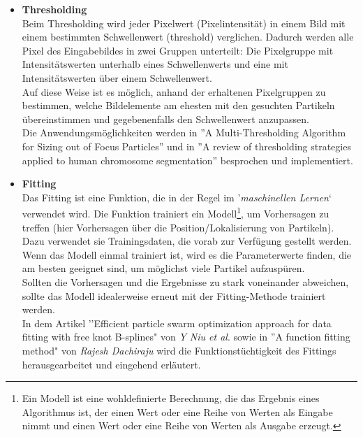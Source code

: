 \begin{itemize}
\item \textbf{Thresholding}\\
Beim Thresholding wird jeder Pixelwert (Pixelintensität) in einem Bild mit einem bestimmten Schwellenwert (threshold) verglichen. Dadurch werden alle Pixel des Eingabebildes in zwei Gruppen unterteilt: Die Pixelgruppe mit Intensitätswerten unterhalb eines Schwellenwerts und eine mit Intensitätswerten über einem Schwellenwert.\\
Auf diese Weise ist es möglich, anhand der erhaltenen Pixelgruppen zu bestimmen, welche Bildelemente am ehesten mit den gesuchten Partikeln übereinstimmen und gegebenenfalls den Schwellenwert anzupassen.\\
Die Anwendungsmöglichkeiten werden in ''A Multi-Thresholding Algorithm for Sizing out of Focus Particles'' \cite{ju2012multi} und in ''A review of thresholding strategies applied to human chromosome segmentation'' \cite{poletti2012review} besprochen und implementiert.


\item \textbf{Fitting}\\
Das Fitting ist eine Funktion, die in der Regel im '\textit{maschinellen Lernen}` verwendet wird. Die Funktion trainiert ein Modell\footnote{Ein Modell ist eine wohldefinierte Berechnung, die das Ergebnis eines Algorithmus ist, der einen Wert oder eine Reihe von Werten als Eingabe nimmt und einen Wert oder eine Reihe von Werten als Ausgabe erzeugt.}, um Vorhersagen zu treffen (hier Vorhersagen über die Position/Lokalisierung von Partikeln). Dazu verwendet sie Trainingsdaten, die vorab zur Verfügung gestellt werden. Wenn das Modell einmal trainiert ist, wird es die Parameterwerte finden, die am besten geeignet sind, um möglichst viele Partikel aufzuspüren.\\ 
Sollten die Vorhersagen und die Ergebnisse zu stark voneinander abweichen, sollte das Modell idealerweise erneut mit der Fitting-Methode trainiert werden.\\
In dem Artikel ''Efficient particle swarm optimization approach for data fitting with free knot B-splines" \cite{galvez2011efficient} von \textit{Y Niu et al}. sowie in ''A function fitting method" \cite{Dachiraju+2020+59+65} von \textit{Rajesh Dachiraju} wird die Funktionstüchtigkeit des Fittings herausgearbeitet und eingehend erläutert.


\end{itemize}
